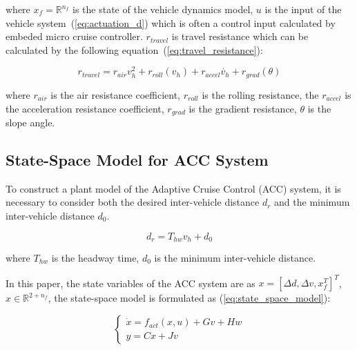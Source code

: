 \documentclass{article}
\numberwithin{equation}{section}
\begin{document}
\noindent where $x_f=\mathbb{R}^{n_{f}}$ is the state of the vehicle dynamics model, $u$ is the input of the 
vehicle system~(\ref{eq:actuation_d}) which is often a control input calculated by embeded 
micro cruise controller. $r_{travel}$ is travel resistance which can be calculated by the
following equation~(\ref{eq:travel_resistance}):

\begin{equation}
    r_{travel}=r_{air}v_h^2 + r_{roll}(v_h)+r_{accel}\dot{v_h}+r_{grad}(\theta)\label{eq:travel_resistance}
\end{equation}
    
\noindent where $r_{air}$ is the air resistance coefficient, $r_{roll}$ is the rolling resistance,
the $r_{accel}$ is the acceleration resistance coefficient, $r_{grad}$ is the gradient resistance,
$\theta$ is the slope angle. 

\subsection{State-Space Model for ACC System}

To construct a plant model of the Adaptive Cruise Control (ACC) system, it is necessary to consider 
both the desired inter-vehicle distance $d_r$ and the minimum inter-vehicle distance $d_0$.

\begin{equation}
    d_r = T_{hw}v_h+d_0\label{eq:inter_vehicle_distance}
\end{equation}

\noindent where $T_{hw}$ is the headway time, $d_0$ is the minimum inter-vehicle distance.

In this paper, the state variables of the ACC system are as $x=[\Delta d,\Delta v,x_f^T]^T$, 
$x\in \mathbb{R}^{2+n_f}$, the state-space model is formulated as (\ref{eq:state_space_model}):

\begin{equation}
    \left\{\begin{array}{l}\label{eq:state_space_model}
        \dot{x}=f_{a c t}\left(x, u\right) + Gv + Hw \\
        y=Cx+Jv
        \end{array}\right.
\end{equation}
\end{document}
